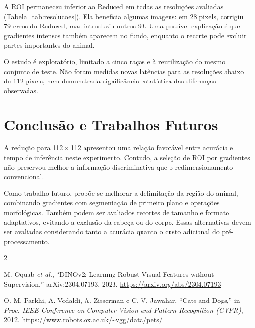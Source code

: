 \documentclass[conference]{IEEEtran}
\begin{document}
A ROI permaneceu inferior ao Reduced em todas as resoluções
avaliadas (Tabela~\ref{tab:resolucoes}). Ela beneficia algumas imagens:
em 28 pixels, corrigiu 79 erros do Reduced, mas introduziu outros 93.
Uma possível explicação é que gradientes intensos também aparecem
no fundo, enquanto o recorte pode excluir partes importantes do animal.

O estudo é exploratório, limitado a cinco raças e à reutilização do
mesmo conjunto de teste. Não foram medidas novas latências para as
resoluções abaixo de 112 pixels, nem demonstrada significância
estatística das diferenças observadas.

\section{Conclusão e Trabalhos Futuros}
A redução para 112\,$\times$\,112 apresentou uma relação favorável
entre acurácia e tempo de inferência neste experimento. Contudo,
a seleção de ROI por gradientes não preservou melhor a informação
discriminativa que o redimensionamento convencional.

Como trabalho futuro, propõe-se melhorar a delimitação da região do
animal, combinando gradientes com segmentação de primeiro plano e
operações morfológicas. Também podem ser avaliados recortes de
tamanho e formato adaptativos, evitando a exclusão da cabeça ou do
corpo. Essas alternativas devem ser avaliadas considerando tanto a
acurácia quanto o custo adicional do pré-processamento.

\begin{thebibliography}{2}

M. Oquab \textit{et al.}, ``DINOv2: Learning Robust Visual Features
without Supervision,'' arXiv:2304.07193, 2023.
\url{https://arxiv.org/abs/2304.07193}

O. M. Parkhi, A. Vedaldi, A. Zisserman e C. V. Jawahar,
``Cats and Dogs,'' in \textit{Proc. IEEE Conference on Computer Vision
and Pattern Recognition (CVPR)}, 2012.
\url{https://www.robots.ox.ac.uk/~vgg/data/pets/}

\end{thebibliography}
\end{document}
